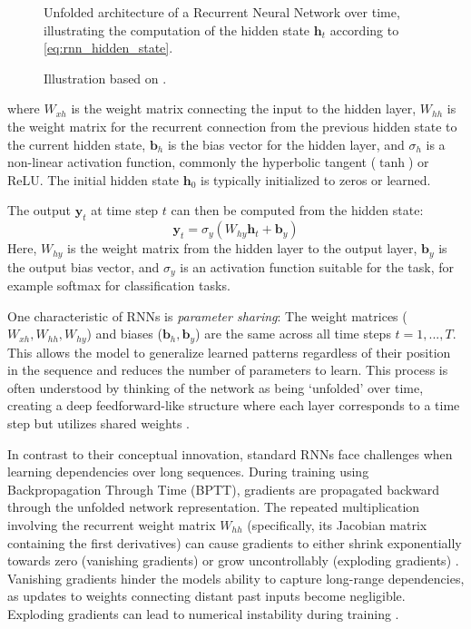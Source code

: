 \begin{figure}[htbp]
  \caption[RNN Unfolded]{Unfolded architecture of a Recurrent Neural Network over time, illustrating the computation of the hidden state \(\bm{h}_t\) according to \autoref{eq:rnn_hidden_state}.}
  \label{fig:rnn_unfolded}
  \caption*{Illustration based on \textcite{geron2022hands}. }
\end{figure}

where \( W_{xh} \) is the weight matrix connecting the input to the hidden layer, \( W_{hh} \) is the weight matrix for the recurrent connection from the previous hidden state to the current hidden state, \( \bm{b}_h \) is the bias vector for the hidden layer, and \( \sigma_h \) is a non-linear activation function, commonly the hyperbolic tangent (\(\tanh\)) or ReLU. The initial hidden state \( \bm{h}_0 \) is typically initialized to zeros or learned.

The output \( \bm{y}_t \) at time step \( t \) can then be computed from the hidden state:
\begin{equation}
  \bm{y}_t = \sigma_y (W_{hy} \bm{h}_t + \bm{b}_y)
  \label{eq:rnn_output}
\end{equation}
Here, \( W_{hy} \) is the weight matrix from the hidden layer to the output layer, \( \bm{b}_y \) is the output bias vector, and \( \sigma_y \) is an activation function suitable for the task, for example softmax for classification tasks.

One characteristic of RNNs is \textit{parameter sharing}: The weight matrices (\( W_{xh}, W_{hh}, W_{hy} \)) and biases (\( \bm{b}_h, \bm{b}_y \)) are the same across all time steps \( t = 1, ..., T \). This allows the model to generalize learned patterns regardless of their position in the sequence and reduces the number of parameters to learn. This process is often understood by thinking of the network as being `unfolded' over time, creating a deep feedforward-like structure where each layer corresponds to a time step but utilizes shared weights \autocite{medsker2001recurrent}.

In contrast to their conceptual innovation, standard RNNs face challenges when learning dependencies over long sequences. During training using Backpropagation Through Time (BPTT), gradients are propagated backward through the unfolded network representation. The repeated multiplication involving the recurrent weight matrix \( W_{hh} \) (specifically, its Jacobian matrix containing the first derivatives) can cause gradients to either shrink exponentially towards zero (vanishing gradients) or grow uncontrollably (exploding gradients) \autocite{hochreiter1998vanishing}. Vanishing gradients hinder the models ability to capture long-range dependencies, as updates to weights connecting distant past inputs become negligible. Exploding gradients can lead to numerical instability during training \autocite{philipp2017exploding}.

